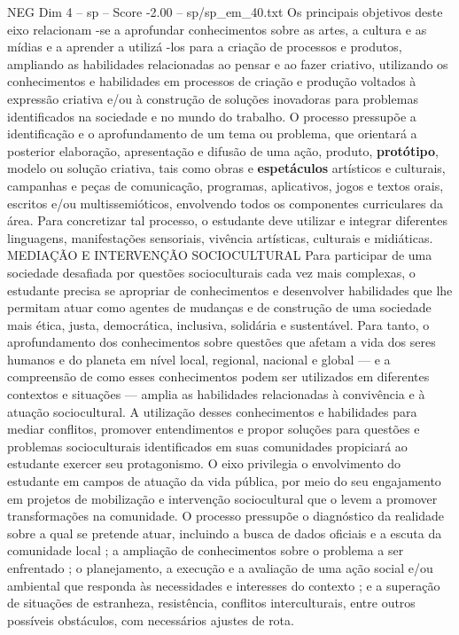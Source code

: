 \begin{textsample}{NEG Dim 4 – sp – Score -2.00 – sp/sp\_em\_40.txt}
Os principais objetivos deste eixo relacionam -se a aprofundar conhecimentos sobre as artes, a cultura e as mídias e a aprender a utilizá -los para a criação de processos e produtos, ampliando as habilidades relacionadas ao pensar e ao fazer criativo, utilizando os conhecimentos e habilidades em processos de criação e produção voltados à expressão criativa e/ou à construção de soluções inovadoras para problemas identificados na sociedade e no mundo do trabalho.
O processo pressupõe a identificação e o aprofundamento de um tema ou problema, que orientará a posterior elaboração, apresentação e difusão de uma ação, produto, \textbf{protótipo}, modelo ou solução criativa, tais como obras e \textbf{espetáculos} artísticos e culturais, campanhas e peças de comunicação, programas, aplicativos, jogos e textos orais, escritos e/ou multissemióticos, envolvendo todos os componentes curriculares da área.
Para concretizar tal processo, o estudante deve utilizar e integrar diferentes linguagens, manifestações sensoriais, vivência artísticas, culturais e midiáticas.
MEDIAÇÃO E INTERVENÇÃO SOCIOCULTURAL Para participar de uma sociedade desafiada por questões socioculturais cada vez mais complexas, o estudante precisa se apropriar de conhecimentos e desenvolver habilidades que lhe permitam atuar como agentes de mudanças e de construção de uma sociedade mais ética, justa, democrática, inclusiva, solidária e sustentável.
Para tanto, o aprofundamento dos conhecimentos sobre questões que afetam a vida dos seres humanos e do planeta em nível local, regional, nacional e global — e a compreensão de como esses conhecimentos podem ser utilizados em diferentes contextos e situações — amplia as habilidades relacionadas à convivência e à atuação sociocultural.
A utilização desses conhecimentos e habilidades para mediar conflitos, promover entendimentos e propor soluções para questões e problemas socioculturais identificados em suas comunidades propiciará ao estudante exercer seu protagonismo.
O eixo privilegia o envolvimento do estudante em campos de atuação da vida pública, por meio do seu engajamento em projetos de mobilização e intervenção sociocultural que o levem a promover transformações na comunidade.
O processo pressupõe o diagnóstico da realidade sobre a qual se pretende atuar, incluindo a busca de dados oficiais e a escuta da comunidade local ; a ampliação de conhecimentos sobre o problema a ser enfrentado ; o planejamento, a execução e a avaliação de uma ação social e/ou ambiental que responda às necessidades e interesses do contexto ; e a superação de situações de estranheza, resistência, conflitos interculturais, entre outros possíveis obstáculos, com necessários ajustes de rota.

\end{textsample}
